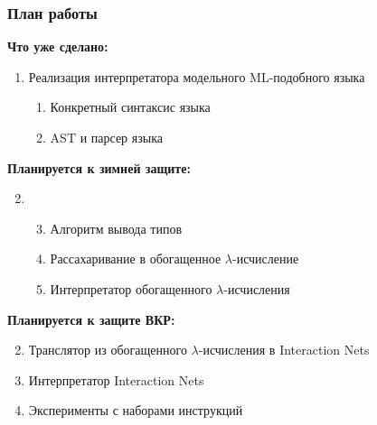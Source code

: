 \documentclass{vkr-slides-style}
\begin{document}
\begin{frame}
    \frametitle{План работы}

    \textbf{Что уже сделано:}
    \begin{enumerate}
        \item Реализация интерпретатора модельного ML-подобного языка
              \begin{enumerate}
                  \item Конкретный синтаксис языка
                  \item AST и парсер языка
              \end{enumerate}
    \end{enumerate}

    \textbf{Планируется к зимней защите:}
    \begin{enumerate}
        \setcounter{enumi}{1}
        \item[]
              \begin{enumerate}
                  \setcounter{enumii}{2}
                  \item Алгоритм вывода типов
                  \item Рассахаривание в обогащенное $\lambda$-исчисление
                  \item Интерпретатор обогащенного $\lambda$-исчисления
              \end{enumerate}
    \end{enumerate}

    \textbf{Планируется к защите ВКР:}
    \begin{enumerate}
        \setcounter{enumi}{1}
        \item Транслятор из обогащенного $\lambda$-исчисления в Interaction Nets
        \item Интерпретатор Interaction Nets
        \item Эксперименты с наборами инструкций
    \end{enumerate}
\end{frame}
\end{document}
